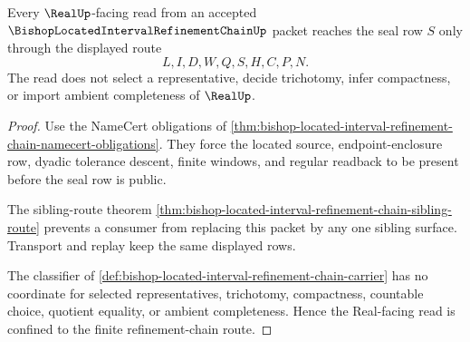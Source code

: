 \begin{theorem}
\label{thm:bishop-located-interval-refinement-chain-real-seal-boundary}
Every $\RealUp$-facing read from an accepted $\BishopLocatedIntervalRefinementChainUp$ packet reaches the seal row $S$ only through the displayed route
$$
L,I,D,W,Q,S,H,C,P,N .
$$
The read does not select a representative, decide trichotomy, infer compactness, or import ambient completeness of $\RealUp$.
\end{theorem}
\begin{proof}
Use the NameCert obligations of \autoref{thm:bishop-located-interval-refinement-chain-namecert-obligations}. They force the located source, endpoint-enclosure row, dyadic tolerance descent, finite windows, and regular readback to be present before the seal row is public.

The sibling-route theorem \autoref{thm:bishop-located-interval-refinement-chain-sibling-route} prevents a consumer from replacing this packet by any one sibling surface. Transport and replay keep the same displayed rows.

The classifier of \autoref{def:bishop-located-interval-refinement-chain-carrier} has no coordinate for selected representatives, trichotomy, compactness, countable choice, quotient equality, or ambient completeness. Hence the Real-facing read is confined to the finite refinement-chain route.
\end{proof}




